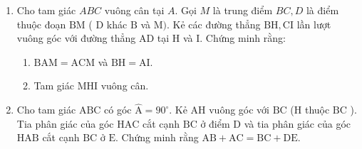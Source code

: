 \begin{bt}
    \hfil
    \begin{enumerate}[1.]
        \item Cho tam giác $A B C$ vuông cân tại $A$. Gọi $M$ là trung điểm $B C, D$ là điểm thuộc đoạn $\mathrm{BM}$ ( $\mathrm{D}$ khác $\mathrm{B}$ và $\mathrm{M})$. Kẻ các đường thẳng $\mathrm{BH}, \mathrm{CI}$ lần lượt vuông góc với đường thẳng $\mathrm{AD}$ tại $\mathrm{H}$ và $\mathrm{I}$. Chứng minh rằng:
        \begin{enumerate}
            \item $\mathrm{BAM}=\mathrm{ACM}$ và $\mathrm{BH}=\mathrm{AI}$.
            \item Tam giác MHI vuông cân.
        \end{enumerate}   
        \item Cho tam giác $\mathrm{ABC}$ có góc $\hat{\mathrm{A}}=90^{\circ}$. Kẻ $\mathrm{AH}$ vuông góc với $\mathrm{BC}$ (H thuộc $\mathrm{BC}$ ). Tia phân giác của góc $\mathrm{HAC}$ cắt cạnh $\mathrm{BC}$ ở điểm $\mathrm{D}$ và tia phân giác của góc $\mathrm{HAB}$ cắt cạnh $\mathrm{BC}$ ở $\mathrm{E}$. Chứng minh rằng $\mathrm{AB}+\mathrm{AC}=\mathrm{BC}+\mathrm{DE}$.
    \end{enumerate}
\end{bt}
